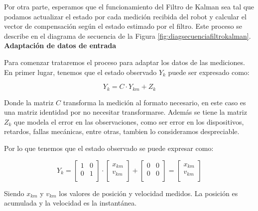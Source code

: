 Por otra parte, esperamos que el funcionamiento del Filtro de Kalman sea tal que podamos actualizar el estado por cada medición recibida del robot y calcular el vector de compensación según el estado estimado por el filtro. Este proceso se describe en el diagrama de secuencia de la Figura \ref{fig:diagsecuenciafiltrokalman}. \\


\textbf{Adaptación de datos de entrada} \mbox{} \vspace{10pt}

Para comenzar trataremos el proceso para adaptar los datos de las mediciones. En primer lugar, tenemos que el estado observado $Y_k$ puede ser expresado como:

$$ Y_k = C \cdot Y_{km} + Z_k $$

Donde la matriz $C$ transforma la medición al formato necesario, en este caso es una matriz identidad por no necesitar transformarse. Además se tiene la matriz $Z_k$ que modela el error en las observaciones, como ser error en los dispositivos, retardos, fallas mecánicas, entre otras, tambien lo consideramos despreciable.

Por lo que tenemos que el estado observado se puede expresar como:

$$ Y_k =
    \begin{bmatrix}
    1 & 0 \\
    0 & 1  \\
    \end{bmatrix}
    \cdot
    \begin{bmatrix} x_{km} \\ v_{km} \\ \end{bmatrix}
    +
    \begin{bmatrix}
    0 & 0  \\
    0 & 0  \\
    \end{bmatrix}
    =
    \begin{bmatrix} x_{km} \\ v_{km} \\ \end{bmatrix}
$$

Siendo $x_{km}$ y $v_{km}$ los valores de posición y velocidad medidos. La posición es acumulada y la velocidad es la instantánea. \\

